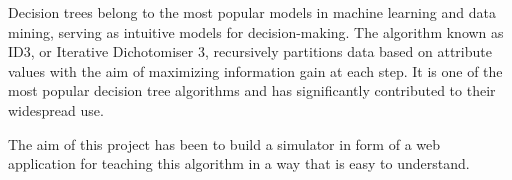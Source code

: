 
Decision trees belong to the most popular models in machine learning and data mining, serving as intuitive models for decision-making. The algorithm known as ID3, or Iterative Dichotomiser 3, recursively partitions data based on attribute values with the aim of maximizing information gain at each step. It is one of the most popular decision tree algorithms and has significantly contributed to their widespread use.

The aim of this project has been to build a simulator in form of a web application for teaching this algorithm in a way that is easy to understand.
